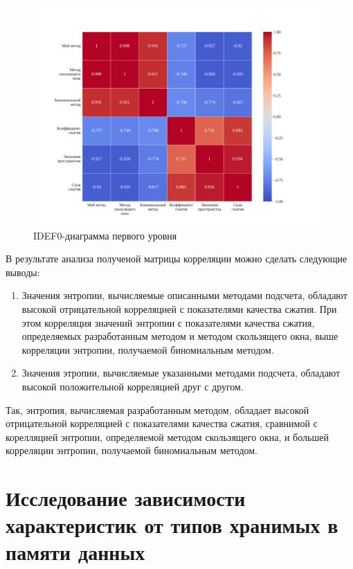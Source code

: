 \begin{figure}[H]
	\begin{center}
		\includegraphics[scale=0.4]{inc/img/correlation-matrix.pdf}
	\end{center}
	\captionsetup{justification=centering}
	\caption{IDEF0-диаграмма первого уровня}
	\label{img:correlation-matrix}
\end{figure}

В результате анализа полученой матрицы корреляции можно сделать следующие выводы:

\begin{enumerate}
    \item Значения энтропии, вычисляемые описанными методами подсчета, обладают высокой отрицательной корреляцией с показателями качества сжатия. При этом корреляция значений энтропии с показателями качества сжатия, определяемых разработанным методом и методом скользящего окна, выше корреляции энтропии, получаемой биномиальным методом.
    \item Значения этропии, вычисляемые указанными методами подсчета, обладают высокой положительной корреляцией друг с другом.
\end{enumerate}

Так, энтропия, вычисляемая разработанным методом, обладает высокой отрицательной корреляцией с показателями качества сжатия, сравнимой с корелляцией энтропии, определяемой методом скользящего окна, и большей корреляции энтропии, получаемой биномиальным методом.

\section{Исследование зависимости характеристик от типов хранимых в памяти данных}

